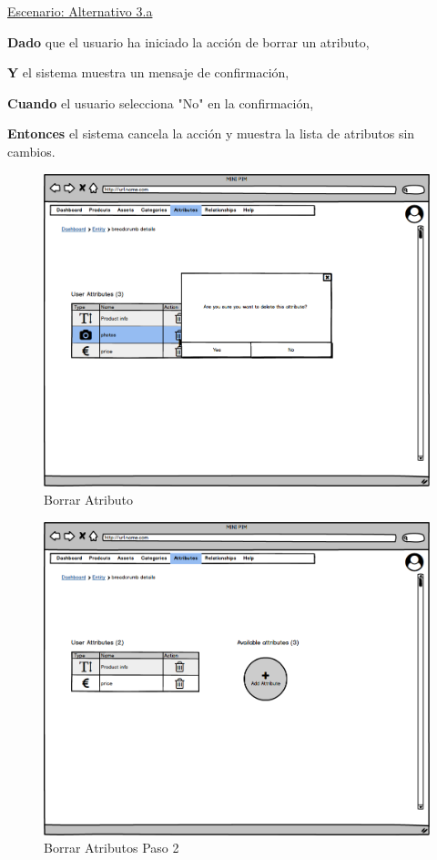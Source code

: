 \underline{Escenario: Alternativo 3.a}\par
\vspace{0.15cm}
\textbf{Dado} que el usuario ha iniciado la acción de borrar un atributo,\par
\textbf{Y} el sistema muestra un mensaje de confirmación,\par
\textbf{Cuando} el usuario selecciona "No" en la confirmación,\par
\textbf{Entonces} el sistema cancela la acción y muestra la lista de atributos sin cambios.\par
\vspace{0.20cm}
\begin{figure}[H]
    \includegraphics[width=1\linewidth]{mockups/RF6.4BorrarAtributo.png}
    \caption{Borrar Atributo}
   \end{figure}
\vspace{1.0cm}
\begin{figure}[H]
    \includegraphics[width=1\linewidth]{mockups/RF6.4BorrarAtributoDespuesDeBorrar.png}
    \caption{Borrar Atributos Paso 2}
   \end{figure}
\vspace{1.0cm}




\newpage %